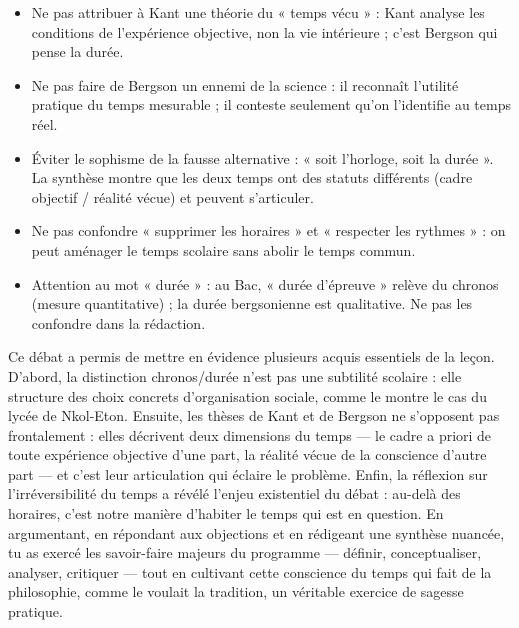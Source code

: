 \documentclass[11pt]{article}
\newcommand{\cle}[1]{{\popxbold\color{popdark}#1}}
\newcounter{popsec}
\newcounter{popsub}
\newcommand{\courssub}[1]{%
  \stepcounter{popsub}%
  \par\vspace{9pt}\noindent{\popxbold\fontsize{11.5}{13}\selectfont\color{popink}{\color{poporange}\thepopsec.\thepopsub}\hspace{6pt}#1}\par\nopagebreak\vspace{4pt}
}
\begin{document}
\begin{attention}
\begin{itemize}
\item Ne pas attribuer à Kant une théorie du « temps vécu » : Kant analyse les conditions de l'expérience objective, non la vie intérieure ; c'est Bergson qui pense la durée.
\item Ne pas faire de Bergson un ennemi de la science : il reconnaît l'utilité pratique du temps mesurable ; il conteste seulement qu'on l'identifie au temps réel.
\item Éviter le sophisme de la fausse alternative : « soit l'horloge, soit la durée ». La synthèse montre que les deux temps ont des statuts différents (cadre objectif / réalité vécue) et peuvent s'articuler.
\item Ne pas confondre « supprimer les horaires » et « respecter les rythmes » : on peut aménager le temps scolaire sans abolir le temps commun.
\item Attention au mot « durée » : au Bac, « durée d'épreuve » relève du \cle{chronos} (mesure quantitative) ; la \cle{durée} bergsonienne est qualitative. Ne pas les confondre dans la rédaction.
\end{itemize}
\end{attention}

\courssub{Bilan de l'activité}

Ce débat a permis de mettre en évidence plusieurs acquis essentiels de la leçon. D'abord, la distinction \cle{chronos}/\cle{durée} n'est pas une subtilité scolaire : elle structure des choix concrets d'organisation sociale, comme le montre le cas du lycée de Nkol-Eton. Ensuite, les thèses de Kant et de Bergson ne s'opposent pas frontalement : elles décrivent deux dimensions du temps — le cadre a priori de toute expérience objective d'une part, la réalité vécue de la conscience d'autre part — et c'est leur articulation qui éclaire le problème. Enfin, la réflexion sur l'\cle{irréversibilité} du temps a révélé l'enjeu existentiel du débat : au-delà des horaires, c'est notre manière d'habiter le temps qui est en question. En argumentant, en répondant aux objections et en rédigeant une synthèse nuancée, tu as exercé les savoir-faire majeurs du programme — définir, conceptualiser, analyser, critiquer — tout en cultivant cette conscience du temps qui fait de la philosophie, comme le voulait la tradition, un véritable exercice de sagesse pratique.

\newpage
\end{document}
